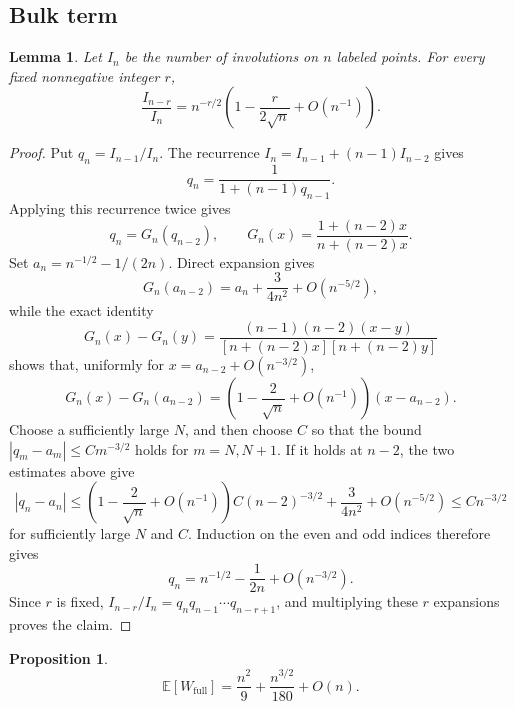\documentclass[11pt]{article}
\newtheorem{proposition}{Proposition}
\newtheorem{lemma}{Lemma}
\begin{document}
\subsection{Bulk term}

\begin{lemma}
\label{lem:involution-ratio}
Let $I_n$ be the number of involutions on $n$ labeled points.  For every
fixed nonnegative integer $r$,
\[
\frac{I_{n-r}}{I_n}
=n^{-r/2}\left(1-\frac{r}{2\sqrt n}+O(n^{-1})\right).
\]
\end{lemma}

\begin{proof}
Put $q_n=I_{n-1}/I_n$.  The recurrence
$I_n=I_{n-1}+(n-1)I_{n-2}$ gives
\[
q_n=\frac{1}{1+(n-1)q_{n-1}}.
\]
Applying this recurrence twice gives
\[
q_n=G_n(q_{n-2}),
\qquad
G_n(x)=\frac{1+(n-2)x}{n+(n-2)x}.
\]
Set $a_n=n^{-1/2}-1/(2n)$.  Direct expansion gives
\[
G_n(a_{n-2})=a_n+\frac{3}{4n^2}+O(n^{-5/2}),
\]
while the exact identity
\[
G_n(x)-G_n(y)
=\frac{(n-1)(n-2)(x-y)}
{[n+(n-2)x][n+(n-2)y]}
\]
shows that, uniformly for $x=a_{n-2}+O(n^{-3/2})$,
\[
G_n(x)-G_n(a_{n-2})
=\left(1-\frac{2}{\sqrt n}+O(n^{-1})\right)(x-a_{n-2}).
\]
Choose a sufficiently large $N$, and then choose $C$ so that the bound
$|q_m-a_m|\leq Cm^{-3/2}$ holds for $m=N,N+1$.  If it holds at $n-2$,
the two estimates above give
\[
|q_n-a_n|
\leq
\left(1-\frac{2}{\sqrt n}+O(n^{-1})\right)C(n-2)^{-3/2}
+\frac{3}{4n^2}+O(n^{-5/2})
\leq Cn^{-3/2}
\]
for sufficiently large $N$ and $C$.  Induction on the even and odd
indices therefore gives
\[
q_n=n^{-1/2}-\frac{1}{2n}+O(n^{-3/2}).
\]
Since $r$ is fixed,
$I_{n-r}/I_n=q_nq_{n-1}\cdots q_{n-r+1}$, and multiplying these $r$
expansions proves the claim.
\end{proof}

\begin{proposition}
\label{prop:bulk}
\[
\mathbb{E}[W_{\mathrm{full}}]
=\frac{n^2}{9}+\frac{n^{3/2}}{180}+O(n).
\]
\end{proposition}
\end{document}
